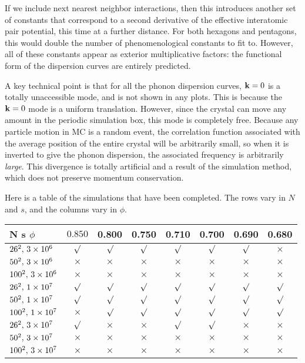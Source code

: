 \documentclass[12pt]{article}
\begin{document}
If we include next nearest neighbor interactions, then this introduces another set of constants that correspond to a second derivative of the effective interatomic pair potential, this time at a further distance. For both hexagons and pentagons, this would double the number of phenomenological constants to fit to. However, all of these constants appear as exterior multiplicative factors: the functional form of the dispersion curves are entirely predicted.

A key technical point is that for all the phonon dispersion curves, $\mathbf{k} = 0$ is a totally unaccessible mode, and is not shown in any plots. This is because the $\mathbf{k} = 0$ mode is a uniform translation. However, since the crystal can move any amount in the periodic simulation box, this mode is completely free. Because any particle motion in MC is a random event, the correlation function associated with the average position of the entire crystal will be arbitrarily small, so when it is inverted to give the phonon dispersion, the associated frequency is arbitrarily \emph{large}. This divergence is totally artificial and a result of the simulation method, which does not preserve momentum conservation.

Here is a table of the simulations that have been completed. The rows vary in $N$ and $s$, and the columns vary in $\phi$.
\begin{center}
\begin{tabular}{|| l ||c|c|c|c|c|c|c||} \hline \hline
N \quad s \quad $\phi$ & $0.850$ & 0.800 & 0.750 & 0.710 & 0.700 & 0.690 & 0.680 \\ \hline \hline
$26^2,\, 3\times10^{6}$ & $\surd$ & $\surd$ & $\surd$ & $\surd$ & $\surd$ & $\surd$ & $\times$ \\ \hline
$50^2, \,3\times10^{6}$ & $\times$ & $\times$ & $\times$ & $\times$ & $\times$ & $\times$ & $\times$ \\ \hline
$100^2,\, 3\times10^{6}$ & $\times$ & $\times$ & $\times$ & $\times$ & $\times$ & $\times$ & $\times$ \\ \hline
$26^2,\, 1\times10^{7}$ & $\surd$ & $\surd$ & $\surd$ & $\surd$ & $\surd$ & $\surd$ & $\surd$ \\ \hline
$50^2, \,1\times10^{7}$ & $\surd$ & $\surd$ & $\surd$ & $\surd$ & $\surd$ & $\surd$ & $\surd$ \\ \hline
$100^2,\, 1\times10^{7}$ & $\times$ & $\surd$ & $\surd$ & $\surd$ & $\surd$ & $\surd$ & $\surd$ \\ \hline
$26^2,\, 3\times10^{7}$ & $\surd$ & $\times$ & $\times$ & $\surd$ & $\surd$ & $\times$ & $\times$ \\ \hline
$50^2, \,3\times10^{7}$ & $\times$ & $\times$ & $\times$ & $\times$ & $\times$ & $\times$ & $\times$ \\ \hline
$100^2,\, 3\times10^{7}$ & $\times$ & $\times$ & $\times$ & $\times$ & $\times$ & $\times$ & $\times$ \\ \hline \hline
\end{tabular}
\end{center}
\end{document}
